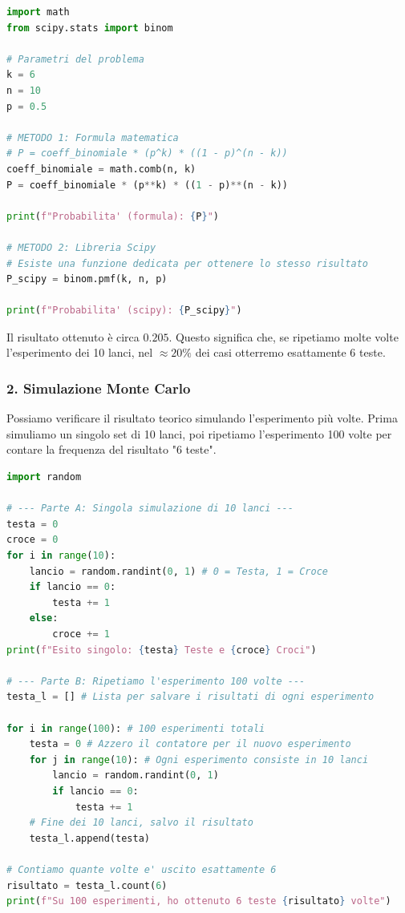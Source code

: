 \documentclass[openany,a4paper,12pt]{book}
\theoremstyle{remark}
\begin{document}
\begin{lstlisting}[language=Python, frame=single, caption=Calcolo probabilità Binomiale]
import math
from scipy.stats import binom

# Parametri del problema
k = 6
n = 10
p = 0.5

# METODO 1: Formula matematica
# P = coeff_binomiale * (p^k) * ((1 - p)^(n - k))
coeff_binomiale = math.comb(n, k)
P = coeff_binomiale * (p**k) * ((1 - p)**(n - k))

print(f"Probabilita' (formula): {P}")

# METODO 2: Libreria Scipy
# Esiste una funzione dedicata per ottenere lo stesso risultato
P_scipy = binom.pmf(k, n, p)

print(f"Probabilita' (scipy): {P_scipy}")
\end{lstlisting}

Il risultato ottenuto è circa $0.205$. Questo significa che, se ripetiamo molte volte l'esperimento dei 10 lanci, nel $\approx 20\%$ dei casi otterremo esattamente 6 teste.

\subsubsection*{2. Simulazione Monte Carlo}
Possiamo verificare il risultato teorico simulando l'esperimento più volte.
Prima simuliamo un singolo set di 10 lanci, poi ripetiamo l'esperimento 100 volte per contare la frequenza del risultato "6 teste".

\begin{lstlisting}[language=Python, frame=single, caption=Simulazione dei lanci]
import random

# --- Parte A: Singola simulazione di 10 lanci ---
testa = 0
croce = 0
for i in range(10):
    lancio = random.randint(0, 1) # 0 = Testa, 1 = Croce
    if lancio == 0:
        testa += 1
    else:
        croce += 1
print(f"Esito singolo: {testa} Teste e {croce} Croci")

# --- Parte B: Ripetiamo l'esperimento 100 volte ---
testa_l = [] # Lista per salvare i risultati di ogni esperimento

for i in range(100): # 100 esperimenti totali
    testa = 0 # Azzero il contatore per il nuovo esperimento
    for j in range(10): # Ogni esperimento consiste in 10 lanci
        lancio = random.randint(0, 1)
        if lancio == 0:
            testa += 1
    # Fine dei 10 lanci, salvo il risultato
    testa_l.append(testa)

# Contiamo quante volte e' uscito esattamente 6
risultato = testa_l.count(6)
print(f"Su 100 esperimenti, ho ottenuto 6 teste {risultato} volte")
\end{lstlisting}
\end{document}
